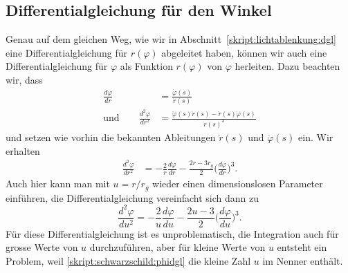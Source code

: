 \subsection{Differentialgleichung für den Winkel}
Genau auf dem gleichen Weg, wie wir in
Abschnitt~\ref{skript:lichtablenkung:dgl}
eine Differentialgleichung für $r(\varphi)$
abgeleitet haben, können wir auch eine Differentialgleichung für
$\varphi$ als Funktion $r(\varphi)$ von $\varphi$ herleiten.
Dazu beachten wir, dass
\begin{align*}
\frac{d\varphi}{dr}&=\frac{\dot \varphi(s)}{\dot r(s)}
\\
\text{und}\qquad
\frac{d^2\varphi}{dr^2}
&=
\frac{\ddot\varphi(s)\dot r(s)-\ddot r(s)\dot\varphi(s)}{\dot r(s)^3}
\end{align*}
und setzen wie vorhin die bekannten Ableitungen $\ddot r(s)$ und
$\ddot\varphi(s)$ ein.
Wir erhalten
\begin{align*}
\frac{d^2\varphi}{dr^2}
&=
-\frac{2}{r}\frac{d\varphi}{dr}
-\frac{2r-3r_g}{2}\biggl(\frac{d\varphi}{dr}\biggr)^3.
\end{align*}
Auch hier kann man mit $u=r/r_g$ wieder einen dimensionslosen Parameter
einführen, die Differentialgleichung vereinfacht sich dann zu
\begin{equation}
\frac{d^2\varphi}{du^2}
=
-\frac2{u}\frac{d\varphi}{du} -\frac{2u-3}2\biggl(\frac{d\varphi}{du}\biggr)^3.
\label{skript:schwarzschild:phidgl}
\end{equation}
Für diese Differentialgleichung ist es unproblematisch, die
Integration auch für grosse Werte von $u$ durchzuführen, aber für
kleine Werte von $u$ entsteht ein Problem, weil 
\eqref{skript:schwarzschild:phidgl} die kleine Zahl $u$ im Nenner
enthält.

